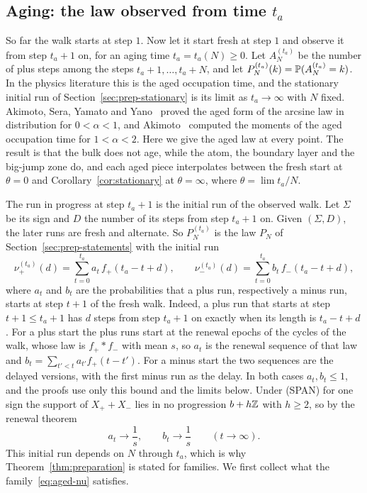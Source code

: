 \subsection{Aging: the law observed from time $t_a$}\label{sec:aging}

So far the walk starts at step $1$. Now let it start fresh at step $1$ and observe
it from step $t_a+1$ on, for an aging time $t_a=t_a(N)\ge0$. Let $A^{(t_a)}_N$ be the
number of plus steps among the steps $t_a+1,\dots,t_a+N$, and let
$P^{(t_a)}_N(k)=\mathbb{P}(A^{(t_a)}_N=k)$. In the physics literature this is the aged
occupation time, and the stationary initial run of Section~\ref{sec:prep-stationary}
is its limit as $t_a\to\infty$ with $N$ fixed. Akimoto, Sera, Yamato and
Yano~\cite{asyy2020} proved the aged form of the arcsine law in distribution for
$0<\alpha<1$, and Akimoto~\cite{akimoto2023} computed the moments of the aged
occupation time for $1<\alpha<2$. Here we give the aged law at every point. The result
is that the bulk does not age, while the atom, the boundary layer and the big-jump
zone do, and each aged piece interpolates between the fresh start at $\theta=0$ and
Corollary~\ref{cor:stationary} at $\theta=\infty$, where $\theta=\lim t_a/N$.

The run in progress at step $t_a+1$ is the initial run of the observed walk. Let
$\Sigma$ be its sign and $D$ the number of its steps from step $t_a+1$ on. Given
$(\Sigma,D)$, the later runs are fresh and alternate. So $P^{(t_a)}_N$ is the law
$P_N$ of Section~\ref{sec:prep-statements} with the initial run
\begin{equation}\label{eq:aged-nu}
 \nu^{(t_a)}_\plus(d)=\sum_{t=0}^{t_a}a_t\,f_\plus(t_a-t+d),\qquad
 \nu^{(t_a)}_\minus(d)=\sum_{t=0}^{t_a}b_t\,f_\minus(t_a-t+d),
\end{equation}
where $a_t$ and $b_t$ are the probabilities that a plus run, respectively a minus
run, starts at step $t+1$ of the fresh walk. Indeed, a plus run that starts at step
$t+1\le t_a+1$ has $d$ steps from step $t_a+1$ on exactly when its length is
$t_a-t+d$. For a plus start the plus runs start at the renewal epochs of the cycles of the walk,
whose law is $f_\plus*f_\minus$ with mean $s$, so $a_t$ is the renewal sequence of that law and
$b_t=\sum_{t'<t}a_{t'}f_\plus(t-t')$. For a minus start the two sequences are the delayed
versions, with the first minus run as the delay. In both cases $a_t,b_t\le1$, and the proofs
use only this bound and the limits below. Under (SPAN) for one sign the support of
$X_\plus+X_\minus$ lies in no progression $b+h\mathbb{Z}$ with $h\ge2$, so by the renewal
theorem~\cite[Section~XIII.3]{feller1968}
\begin{equation}\label{eq:aged-renewal}
 a_t\to\frac1s,\qquad b_t\to\frac1s\qquad(t\to\infty).
\end{equation}
This initial run depends on $N$ through $t_a$, which is why Theorem~\ref{thm:preparation}
is stated for families. We first collect what the family~\eqref{eq:aged-nu} satisfies.

